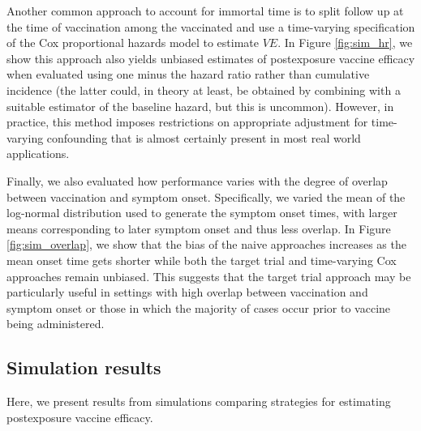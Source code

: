 \begin{appendix}
    Another common approach to account for immortal time is to split follow up at the time of vaccination among the vaccinated and use a time-varying specification of the Cox proportional hazards model to estimate $VE$. In Figure \ref{fig:sim_hr}, we show this approach also yields unbiased estimates of postexposure vaccine efficacy when evaluated using one minus the hazard ratio rather than cumulative incidence (the latter could, in theory at least, be obtained by combining with a suitable estimator of the baseline hazard, but this is uncommon). However, in practice, this method imposes restrictions on appropriate adjustment for time-varying confounding that is almost certainly present in most real world applications. 

    Finally, we also evaluated how performance varies with the degree of overlap between vaccination and symptom onset. Specifically, we varied the mean of the log-normal distribution used to generate the symptom onset times, with larger means corresponding to later symptom onset and thus less overlap. In Figure \ref{fig:sim_overlap}, we show that the bias of the naive approaches increases as the mean onset time gets shorter while both the target trial and time-varying Cox approaches remain unbiased. This suggests that the target trial approach may be particularly useful in settings with high overlap between vaccination and symptom onset or those in which the majority of cases occur prior to vaccine being administered.

    \subsection{Simulation results} \label{sec:add_simulation}

    Here, we present results from simulations comparing strategies for estimating postexposure vaccine efficacy. 


\end{appendix}
